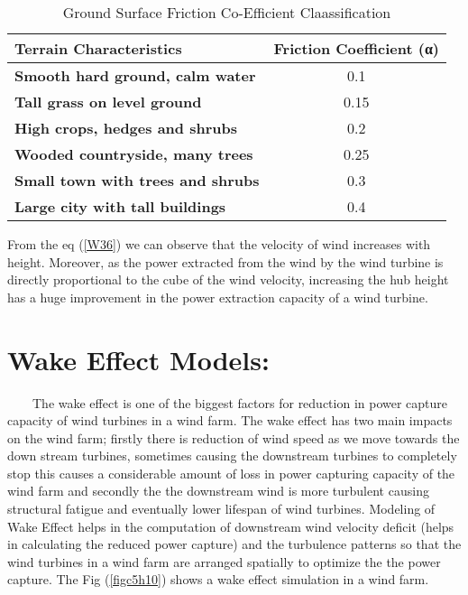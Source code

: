 \begin{table}[H]
  \centering
  \caption{Ground Surface Friction Co-Efficient Claassification}
    \begin{tabular}{|l|c|}
    \hline
    \textbf{Terrain Characteristics} & \multicolumn{1}{l|}{\textbf{Friction Coefficient (α)}} \bigstrut\\
    \hline
    \textbf{Smooth hard ground, calm water } & 0.1 \bigstrut\\
    \hline
    \textbf{Tall grass on level ground } & 0.15 \bigstrut\\
    \hline
    \textbf{High crops, hedges and shrubs } & 0.2 \bigstrut\\
    \hline
    \textbf{Wooded countryside, many trees } & 0.25 \bigstrut\\
    \hline
    \textbf{Small town with trees and shrubs } & 0.3 \bigstrut\\
    \hline
    \textbf{Large city with tall buildings } & 0.4 \bigstrut\\
    \hline
    \end{tabular}%
  \label{c5Tab1}%
\end{table}%

From the eq (\ref{W36}) we can observe that the velocity of wind increases with height. Moreover, as the power extracted from the wind by the wind turbine is directly proportional to the cube of the wind velocity, increasing the hub height has a huge improvement in the power extraction capacity of a wind turbine.\\
	     
\section{Wake Effect Models:}
\
\
\
\
The wake effect is one of the biggest factors for reduction in power capture capacity of wind turbines in a wind farm. The wake effect has two main impacts on the wind farm; firstly there is reduction of wind speed as we move towards the down stream turbines, sometimes causing the downstream turbines to completely stop this causes a considerable amount of loss in power capturing capacity of the wind farm and secondly the the downstream wind is more turbulent causing structural fatigue and eventually lower lifespan of wind turbines. Modeling of Wake Effect helps in the computation of downstream wind velocity deficit (helps in calculating the reduced power capture) and the turbulence patterns so that the wind turbines in a wind farm are arranged spatially to optimize the the power capture. The Fig (\ref{figc5h10}) shows a wake effect simulation in a wind farm.

